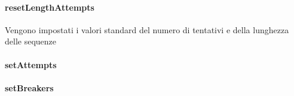 \documentclass[letterpaper,10pt,italian]{sphinxmanual}
\begin{document}
\begin{fulllineitems}
\label{\detokenize{source/it/unicam/cs/pa/mastermind/ui/StartStats:it.unicam.cs.pa.mastermind.ui.StartStats.isToContinue()}}
\end{fulllineitems}



\paragraph{resetLengthAttempts}
\label{\detokenize{source/it/unicam/cs/pa/mastermind/ui/StartStats:resetlengthattempts}}

\begin{fulllineitems}
\label{\detokenize{source/it/unicam/cs/pa/mastermind/ui/StartStats:it.unicam.cs.pa.mastermind.ui.StartStats.resetLengthAttempts()}}
Vengono impostati i valori standard del numero di tentativi e della lunghezza delle sequenze

\end{fulllineitems}



\paragraph{setAttempts}
\label{\detokenize{source/it/unicam/cs/pa/mastermind/ui/StartStats:setattempts}}

\begin{fulllineitems}
\label{\detokenize{source/it/unicam/cs/pa/mastermind/ui/StartStats:it.unicam.cs.pa.mastermind.ui.StartStats.setAttempts(int)}}
\end{fulllineitems}



\paragraph{setBreakers}
\label{\detokenize{source/it/unicam/cs/pa/mastermind/ui/StartStats:setbreakers}}
\end{document}

